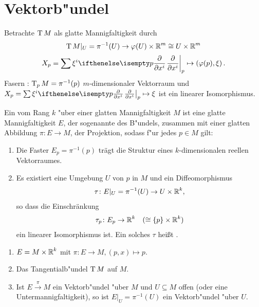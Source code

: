 \chapter{Vektorb"undel}

Betrachte $\operatorname{T} M$ als glatte Mannigfaltigkeit durch
	\[ \operatorname{T} M|_U = \pi^{-1}(U) \to \varphi(U) \times \operatorname{\mathbb{R}}^m \cong U \times \operatorname{\mathbb{R}}^m \]
	\[ X_p = \sum \xi^i\pdifffrac[p]{}{x^i} \mapsto \left(\varphi(p),\xi\right). \]
Fasern : $\operatorname{T}_pM = \pi^{-1}(p)$ $m$-dimensionaler Vektorraum und $X_p = \sum \xi^i \pdifffrac[p]{}{x^i} \mapsto \xi$ ist ein linearer Isomorphismus.

\begin{Dfn}
  Ein  vom Rang $k$ "uber einer glatten Mannigfaltigkeit $M$ ist eine glatte Mannigfaltigkeit $E$, der sogenannte  des B"undels, zusammen mit einer glatten Abbildung $\pi \colon E \to M$, der Projektion, sodass f"ur jedes $p \in M$ gilt:
  \begin{enumerate}[label=(\roman*)]
  \item Die Faster $E_p = \pi^{-1}(p)$ trägt die Struktur eines $k$-dimensionalen reellen Vektorraumes.
  \item Es existiert eine Umgebung $U$ von $p$ in $M$ und ein Diffeomorphismus
    \begin{align*}
      \tau \colon E|_U = \pi^{-1}(U) \to U \times \operatorname{\mathbb{R}}^k,
    \end{align*}
    so dass die Einschränkung
    \begin{align*}
      \tau_p \colon E_p \to \operatorname{\mathbb{R}}^k \quad ( \cong \{p\} \times \operatorname{\mathbb{R}}^k)
    \end{align*}
    ein linearer Isomorphismus ist.
    Ein solches $\tau$ heißt .
  \end{enumerate}
\end{Dfn}

\begin{bsp}
  \begin{enumerate}[label=(\arabic*)]
  \item $E = M \times \operatorname{\mathbb{R}}^k$ mit $\pi \colon E \to M, (p,x) \mapsto p$.
  \item Das Tangentialb"undel $\operatorname{T} M$ auf $M$.
  \item Ist $E \xrightarrow{\pi} M$ ein Vektorb"undel "uber $M$ und $U \subseteq M$ offen (oder eine Untermannigfaltigkeit), so ist $E|_U = \pi^{-1}(U)$ ein Vektorb"undel "uber $U$.
  \end{enumerate}
\end{bsp}

